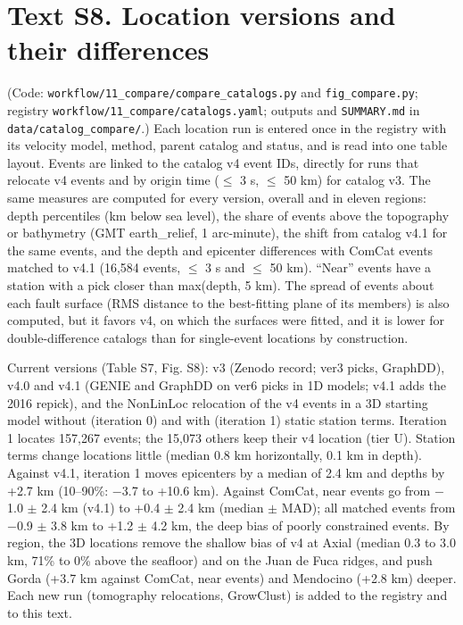 \documentclass[11pt]{article}
\begin{document}
\section{Text S8. Location versions and their
differences}\label{text-s8.-location-versions-and-their-differences}

(Code: \texttt{workflow/11\_compare/compare\_catalogs.py} and
\texttt{fig\_compare.py}; registry
\texttt{workflow/11\_compare/catalogs.yaml}; outputs and
\texttt{SUMMARY.md} in \texttt{data/catalog\_compare/}.) Each location
run is entered once in the registry with its velocity model, method,
parent catalog and status, and is read into one table layout. Events are
linked to the catalog v4 event IDs, directly for runs that relocate v4
events and by origin time (\ensuremath{\leq} 3 s, \ensuremath{\leq} 50 km) for catalog v3. The same
measures are computed for every version, overall and in eleven regions:
depth percentiles (km below sea level), the share of events above the
topography or bathymetry (GMT earth\_relief, 1 arc-minute), the shift
from catalog v4.1 for the same events, and the depth and epicenter
differences with ComCat events matched to v4.1 (16,584 events, \ensuremath{\leq} 3 s and
\ensuremath{\leq} 50 km). ``Near'' events have a station with a pick closer than
max(depth, 5 km). The spread of events about each fault surface (RMS
distance to the best-fitting plane of its members) is also computed, but
it favors v4, on which the surfaces were fitted, and it is lower for
double-difference catalogs than for single-event locations by
construction.

Current versions (Table S7, Fig. S8): v3 (Zenodo record; ver3 picks,
GraphDD), v4.0 and v4.1 (GENIE and GraphDD on ver6 picks in 1D models;
v4.1 adds the 2016 repick), and the NonLinLoc relocation of the v4
events in a 3D starting model without (iteration 0) and with (iteration
1) static station terms. Iteration 1 locates 157,267 events; the 15,073
others keep their v4 location (tier U). Station terms change locations
little (median 0.8 km horizontally, 0.1 km in depth). Against v4.1,
iteration 1 moves epicenters by a median of 2.4 km and depths by +2.7 km
(10--90\%: \ensuremath{-}3.7 to +10.6 km). Against ComCat, near events go from \ensuremath{-}1.0 \ensuremath{\pm}
2.4 km (v4.1) to +0.4 \ensuremath{\pm} 2.4 km (median \ensuremath{\pm} MAD); all matched events from
\ensuremath{-}0.9 \ensuremath{\pm} 3.8 km to +1.2 \ensuremath{\pm} 4.2 km, the deep bias of poorly constrained
events. By region, the 3D locations remove the shallow bias of v4 at
Axial (median 0.3 to 3.0 km, 71\% to 0\% above the seafloor) and on the
Juan de Fuca ridges, and push Gorda (+3.7 km against ComCat, near
events) and Mendocino (+2.8 km) deeper. Each new run (tomography
relocations, GrowClust) is added to the registry and to this text.
\end{document}
